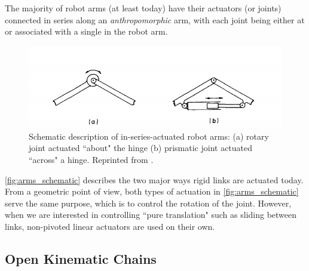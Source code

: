  The majority of robot arms (at least today) have their actuators (or joints) connected in series along an \textit{anthropomorphic} arm, with each joint being either at or associated with a single \dof in the robot arm. 
\begin{figure}[tb!]
	\centering
	\includegraphics[width=\columnwidth]{figures/arms_hunt.png}
	\caption{Schematic description of in-series-actuated robot arms: (a) rotary joint actuated ``about" the hinge (b) prismatic joint actuated ``across" a hinge. Reprinted from \cite{Hunt1983}.}
	\label{fig:arms_schematic}
\end{figure}
%
\autoref{fig:arms_schematic} describes the two major ways rigid links are actuated today. From a geometric point of view, both types of actuation in \autoref{fig:arms_schematic} serve the same purpose, which is to control the rotation of the joint. However, when we are interested in controlling ``pure translation" such as sliding between links, non-pivoted linear actuators are used on their own. 


\subsection{Open Kinematic Chains}

